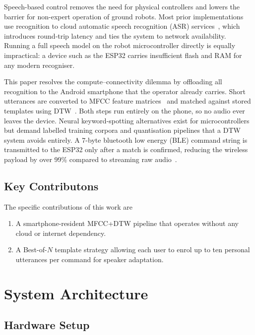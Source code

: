 \documentclass[conference]{IEEEtran}
\begin{document}
	Speech-based control removes the need for physical controllers
	and lowers the barrier for non-expert operation of ground robots.
	Most prior implementations use recognition to cloud automatic speech recognition (ASR)
	services~\cite{li2017speech}, which introduces round-trip
	latency and ties the system to network availability. Running
	a full speech model on the robot microcontroller directly is
	equally impractical: a device such as the ESP32 carries
	insufficient flash and RAM for any modern recogniser.
	
	This paper resolves the compute--connectivity dilemma by
	offloading all recognition to the Android smartphone that
	the operator already carries. Short utterances are converted
	to MFCC feature matrices~\cite{davis1980mfcc} and matched
	against stored templates using DTW~\cite{sakoe1978dtw}.
	Both steps run entirely on the phone, so no audio ever leaves
	the device. Neural keyword-spotting alternatives exist for
	microcontrollers~\cite{zhang2017hello, choi2019iot} but demand
	labelled training corpora and quantisation pipelines that a
	DTW system avoids entirely. A 7-byte bluetooth low energy (BLE) command string is
	transmitted to the ESP32 only after a match is confirmed,
	reducing the wireless payload by over 99\% compared to
	streaming raw audio~\cite{mikhaylov2013ble}.
	\subsection{Key Contributons}
	The specific contributions of this work are
	\begin{enumerate}
		\item A smartphone-resident MFCC+DTW pipeline that operates
		without any cloud or internet dependency.
		\item A Best-of-$N$ template strategy allowing each user to
		enrol up to ten personal utterances per command for
		speaker adaptation.

	\end{enumerate}
	\section{System Architecture} \label{sec:architecture}
	
	\subsection{Hardware Setup} \label{sec:hardware}
	
\end{document}
